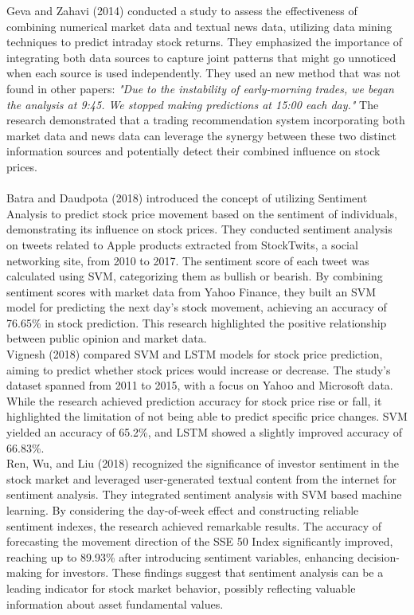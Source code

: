 Geva and Zahavi (2014) conducted a study to assess the effectiveness of combining numerical market data and textual news data, utilizing data mining techniques to predict intraday stock returns. They emphasized the importance of integrating both data sources to capture joint patterns that might go unnoticed when each source is used independently. They used an new method that was not found in other papers: \textit{"Due to the instability of early-morning
	trades, we began the analysis at 9:45. We stopped making predictions
	at 15:00 each day."} The research demonstrated that a trading recommendation system incorporating both market data and news data can leverage the synergy between these two distinct information sources and potentially detect their combined influence on stock prices.\cite{geva2014empirical}\\
\\
Batra and Daudpota (2018) introduced the concept of utilizing Sentiment Analysis to predict stock price movement based on the sentiment of individuals, demonstrating its influence on stock prices. They conducted sentiment analysis on tweets related to Apple products extracted from StockTwits, a social networking site, from 2010 to 2017. The sentiment score of each tweet was calculated using \ac{SVM}, categorizing them as bullish or bearish. By combining sentiment scores with market data from Yahoo Finance, they built an \ac{SVM} model for predicting the next day's stock movement, achieving an accuracy of 76.65\% in stock prediction. This research highlighted the positive relationship between public opinion and market data.\cite{batra2018integrating}\\

Vignesh (2018) compared \ac{SVM} and \ac{LSTM} models for stock price prediction, aiming to predict whether stock prices would increase or decrease. The study's dataset spanned from 2011 to 2015, with a focus on Yahoo and Microsoft data. While the research achieved prediction accuracy for stock price rise or fall, it highlighted the limitation of not being able to predict specific price changes. \ac{SVM} yielded an accuracy of 65.2\%, and \ac{LSTM} showed a slightly improved accuracy of 66.83\%.\cite{vignesh2018applying}\\

Ren, Wu, and Liu (2018) recognized the significance of investor sentiment in the stock market and leveraged user-generated textual content from the internet for sentiment analysis. They integrated sentiment analysis with \ac{SVM} based machine learning. By considering the day-of-week effect and constructing reliable sentiment indexes, the research achieved remarkable results. The accuracy of forecasting the movement direction of the SSE 50 Index significantly improved, reaching up to 89.93\% after introducing sentiment variables, enhancing decision-making for investors. These findings suggest that sentiment analysis can be a leading indicator for stock market behavior, possibly reflecting valuable information about asset fundamental values.\cite{ren2018forecasting}\\

